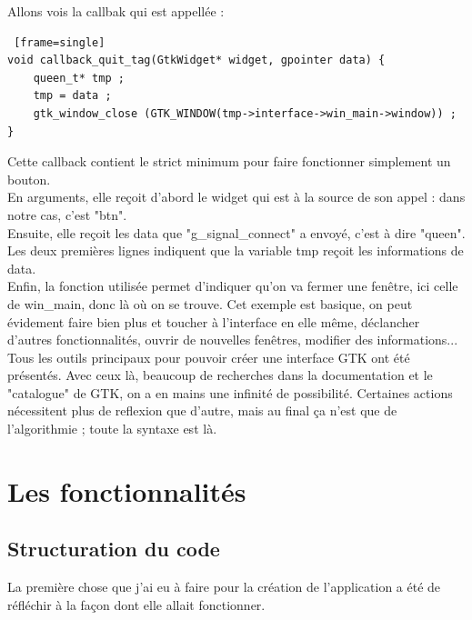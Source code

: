 \documentclass[11pt,french,a4paper]{report}
\begin{document}
Allons vois la callbak qui est appellée : \\

\begin{lstlisting} [frame=single]
void callback_quit_tag(GtkWidget* widget, gpointer data) {                                       
    queen_t* tmp ;                                                                             
    tmp = data ;                                                                                
    gtk_window_close (GTK_WINDOW(tmp->interface->win_main->window)) ; 
} 
\end{lstlisting}

Cette callback contient le strict minimum pour faire fonctionner simplement un bouton.\\
En arguments, elle reçoit d'abord le widget qui est à la source de son appel : dans notre cas, c'est "btn". \\
Ensuite, elle reçoit les data que "g\_signal\_connect" a envoyé, c'est à dire "queen". \\

Les deux premières lignes indiquent que la variable tmp reçoit les informations de data. \\
Enfin, la fonction utilisée permet d'indiquer qu'on va fermer une fenêtre, ici celle de win\_main, donc là où on
se trouve. Cet exemple est basique, on peut évidement faire bien plus et toucher à l'interface en elle même, déclancher
d'autres fonctionnalités, ouvrir de nouvelles fenêtres, modifier des informations...\\

Tous les outils principaux pour pouvoir créer une interface GTK ont été présentés. Avec ceux là, beaucoup de recherches
dans la documentation et le "catalogue" %
de GTK, on a en mains une infinité de possibilité. Certaines actions nécessitent plus de reflexion que d'autre, mais 
au final ça n'est que de l'algorithmie ; toute la syntaxe est là. \\


    \section{Les fonctionnalités} 
        \subsection{Structuration du code}

La première chose que j'ai eu à faire pour la création de l'application a été de réfléchir à la façon dont elle allait fonctionner.
\end{document}
